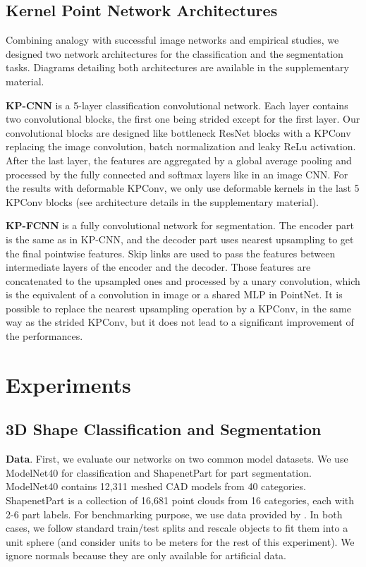 \documentclass[10pt,twocolumn,letterpaper]{article}
\begin{document}
\subsection{Kernel Point Network Architectures}

Combining analogy with successful image networks and empirical studies, we designed two network architectures for the classification and the segmentation tasks. Diagrams detailing both architectures are available in the supplementary material.

\noindent
\textbf{KP-CNN} is a 5-layer classification convolutional network. Each layer contains two convolutional blocks, the first one being strided except for the first layer. Our convolutional blocks are designed like bottleneck ResNet blocks \cite{he2016deep} with a KPConv replacing the image convolution, batch normalization and leaky ReLu activation. After the last layer, the features are aggregated by a global average pooling and processed by the fully connected and softmax layers like in an image CNN. For the results with deformable KPConv, we only use deformable kernels in the last 5 KPConv blocks (see architecture details in the supplementary material).

\noindent
\textbf{KP-FCNN} is a fully convolutional network for segmentation. The encoder part is the same as in KP-CNN, and the decoder part uses nearest upsampling to get the final pointwise features. Skip links are used to pass the features between intermediate layers of the encoder and the decoder. Those features are concatenated to the upsampled ones and processed by a unary convolution, which is the equivalent of a  convolution in image or a shared MLP in PointNet. It is possible to replace the nearest upsampling operation by a KPConv, in the same way as the strided KPConv, but it does not lead to a significant improvement of the performances.

\section{Experiments}

\subsection{3D Shape Classification and Segmentation}

\noindent
\textbf{Data}. First, we evaluate our networks on two common model datasets. We use ModelNet40 \cite{wu20153d} for classification and ShapenetPart \cite{yi2016scalable} for part segmentation. ModelNet40 contains 12,311 meshed CAD models from 40 categories. ShapenetPart is a collection of 16,681 point clouds from 16 categories, each with 2-6 part labels. For benchmarking purpose, we use data provided by \cite{qi2017pointnet++}. In both cases, we follow standard train/test splits and rescale objects to fit them into a unit sphere (and consider units to be meters for the rest of this experiment). We ignore normals because they are only available for artificial data.
\end{document}
